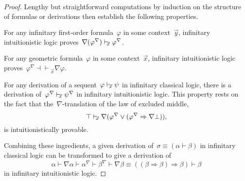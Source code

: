 \documentclass{ws-rv9x6}
\begin{document}
{\begin{proof}
Lengthy but straightforward computations by induction on the structure of
formulas or derivations then establish the following properties.
\begin{alphlist}
\item For any infinitary first-order formula~$\varphi$ in some context~$\vec y$,
infinitary intuitionistic logic proves~$\nabla(\varphi^\nabla) \mathrel{\vdash\!\!\!_{\vec x}} \varphi^\nabla$.
\item For any geometric formula~$\varphi$ in some context~$\vec x$, infinitary
intuitionistic logic proves~$\varphi^\nabla \mathrel{\dashv\vdash\!\!\!_{\vec x}} \nabla\varphi$.
\item For any derivation of a sequent~$\varphi \mathrel{\vdash\!\!\!_{\vec x}} \psi$ in infinitary
classical logic, there is a derivation of~$\varphi^\nabla \mathrel{\vdash\!\!\!_{\vec x}}
\psi^\nabla$ in infinitary intuitionistic logic. This property rests on the
fact that the~$\nabla$-translation of the law of excluded middle,
\[ \top \mathrel{\vdash\!\!\!_{\vec x}} \nabla(\varphi^\nabla \vee (\varphi^\nabla \Rightarrow \nabla\bot)), \]
is intuitionistically provable.
\end{alphlist}
Combining these ingredients, a given derivation of~$\sigma \equiv (\alpha
\vdash \beta)$ in infinitary classical logic can be transformed to give a derivation of
\[
  \alpha \vdash
  \nabla\alpha \vdash
  \alpha^\nabla \vdash
  \beta^\nabla \vdash
  \nabla\beta \equiv
  ((\beta \Rightarrow \beta) \Rightarrow \beta) \vdash
  \beta
\]
in infinitary intuitionistic logic.


\end{proof}}
\end{document}
